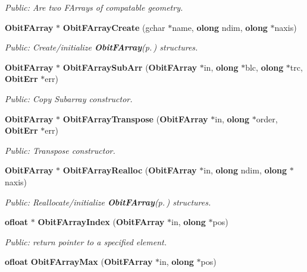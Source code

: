 \begin{CompactItemize}
\begin{CompactList}\small\item\em Public: Are two FArrays of compatable geometry. \item\end{CompactList}\item 
{\bf Obit\-FArray} $\ast$ {\bf Obit\-FArray\-Create} (gchar $\ast$name, {\bf olong} ndim, {\bf olong} $\ast$naxis)
\begin{CompactList}\small\item\em Public: Create/initialize {\bf Obit\-FArray}{\rm (p.\,\pageref{structObitFArray})} structures. \item\end{CompactList}\item 
{\bf Obit\-FArray} $\ast$ {\bf Obit\-FArray\-Sub\-Arr} ({\bf Obit\-FArray} $\ast$in, {\bf olong} $\ast$blc, {\bf olong} $\ast$trc, {\bf Obit\-Err} $\ast$err)
\begin{CompactList}\small\item\em Public: Copy Subarray constructor. \item\end{CompactList}\item 
{\bf Obit\-FArray} $\ast$ {\bf Obit\-FArray\-Transpose} ({\bf Obit\-FArray} $\ast$in, {\bf olong} $\ast$order, {\bf Obit\-Err} $\ast$err)
\begin{CompactList}\small\item\em Public: Transpose constructor. \item\end{CompactList}\item 
{\bf Obit\-FArray} $\ast$ {\bf Obit\-FArray\-Realloc} ({\bf Obit\-FArray} $\ast$in, {\bf olong} ndim, {\bf olong} $\ast$naxis)
\begin{CompactList}\small\item\em Public: Reallocate/initialize {\bf Obit\-FArray}{\rm (p.\,\pageref{structObitFArray})} structures. \item\end{CompactList}\item 
{\bf ofloat} $\ast$ {\bf Obit\-FArray\-Index} ({\bf Obit\-FArray} $\ast$in, {\bf olong} $\ast$pos)
\begin{CompactList}\small\item\em Public: return pointer to a specified element. \item\end{CompactList}\item 
{\bf ofloat} {\bf Obit\-FArray\-Max} ({\bf Obit\-FArray} $\ast$in, {\bf olong} $\ast$pos)

\end{CompactItemize}
